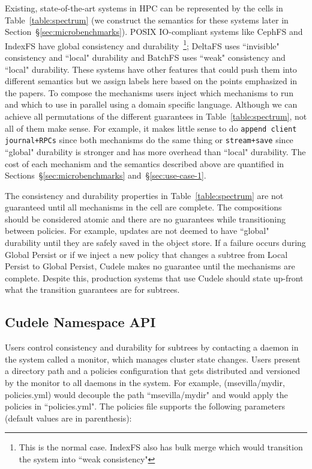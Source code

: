 Existing, state-of-the-art systems in HPC can be represented by the cells in
Table~\ref{table:spectrum} (we construct the semantics for these systems later
in Section~\S\ref{sec:microbenchmarks}).  POSIX IO-compliant systems like
CephFS and IndexFS have global consistency and durability~\footnote{This is the
normal case.  IndexFS also has bulk merge which would transition the system
into ``weak consistency"}; DeltaFS uses ``invisible" consistency and ``local"
durability and BatchFS uses ``weak" consistency and ``local" durability. These
systems have other features that could push them into different semantics but
we assign labels here based on the points emphasized in the papers.  To compose
the mechanisms users inject which mechanisms to run and which to use in
parallel using a domain specific language.  Although we can achieve all
permutations of the different guarantees in Table~\ref{table:spectrum}, not all
of them make sense. For example, it makes little sense to do \texttt{append
client journal+RPCs} since both mechanisms do the same thing or
\texttt{stream+save} since ``global" durability is stronger and has more
overhead than ``local" durability. The cost of each mechanism and the semantics
described above are quantified in Sections~\S\ref{sec:microbenchmarks}
and~\S\ref{sec:use-case-1}.

The consistency and durability properties in Table~\ref{table:spectrum} are not
guaranteed until all mechanisms in the cell are complete. The compositions
should be considered atomic and there are no guarantees while transitioning
between policies. For example, updates are not deemed to have ``global"
durability until they are safely saved in the object store. If a failure occurs
during Global Persist or if we inject a new policy that changes a subtree from
Local Persist to Global Persist, Cudele makes no guarantee until the mechanisms
are complete. Despite this, production systems that use Cudele should state
up-front what the transition guarantees are for subtrees.

\subsection{Cudele Namespace API}
\label{sec:cudelefs-namespace-api}

Users control consistency and durability for subtrees by contacting a daemon in
the system called a monitor, which manages cluster state changes.  Users
present a directory path and a policies configuration that gets distributed and
versioned by the monitor to all daemons in the system. For example,
(msevilla/mydir, policies.yml) would decouple the path ``msevilla/mydir" and
would apply the policies in ``policies.yml".  The policies file supports the
following parameters (default values are in parenthesis):

